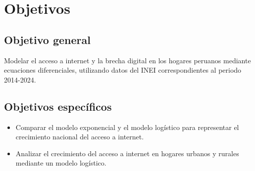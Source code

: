 \section{Objetivos}

\subsection{Objetivo general}

Modelar el acceso a internet y la brecha digital en los hogares peruanos mediante ecuaciones diferenciales, utilizando datos del INEI correspondientes al periodo 2014-2024.

\subsection{Objetivos específicos}

\begin{itemize}
    \item Comparar el modelo exponencial y el modelo logístico para representar el crecimiento nacional del acceso a internet.
    \item Analizar el crecimiento del acceso a internet en hogares urbanos y rurales mediante un modelo logístico.
\end{itemize}
